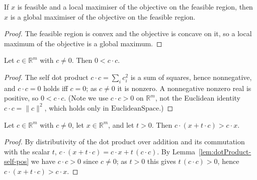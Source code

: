 \begin{lemma}
    \label{lem:local-max-global}
    \leanok
    If $x$ is feasible and a local maximiser of the objective on the feasible
    region, then $x$ is a global maximiser of the objective on the feasible
    region.
\end{lemma}
\begin{proof}
    The feasible region is convex and the objective is concave on it, so a
    local maximum of the objective is a global maximum.
\end{proof}

\begin{lemma}
    \label{lem:dotProduct-self-pos}
    \leanok
    Let $c \in \mathbb{R}^m$ with $c \ne 0$. Then $0 < c \cdot c$.
\end{lemma}
\begin{proof}
    The self dot product $c \cdot c = \sum_i c_i^2$ is a sum of squares, hence
    nonnegative, and $c \cdot c = 0$ holds iff $c = 0$; as $c \ne 0$ it is
    nonzero. A nonnegative nonzero real is positive, so $0 < c \cdot c$. (Note we
    use $c \cdot c > 0$ on $\mathbb{R}^m$, not the Euclidean identity
    $c \cdot c = \lVert c \rVert^2$, which holds only in $\mathrm{EuclideanSpace}$.)
\end{proof}

\begin{lemma}
    \label{lem:dotProduct-ascent}
    \leanok
    Let $c \in \mathbb{R}^m$ with $c \ne 0$, let $x \in \mathbb{R}^m$, and let
    $t > 0$. Then $c \cdot (x + t \cdot c) > c \cdot x$.
\end{lemma}
\begin{proof}
    By distributivity of the dot product over addition and its commutation with
    the scalar $t$, $c \cdot (x + t \cdot c) = c \cdot x + t\,(c \cdot c)$. By
    Lemma~\ref{lem:dotProduct-self-pos} we have $c \cdot c > 0$ since $c \ne 0$;
    as $t > 0$ this gives $t\,(c \cdot c) > 0$, hence
    $c \cdot (x + t \cdot c) > c \cdot x$.
\end{proof}

